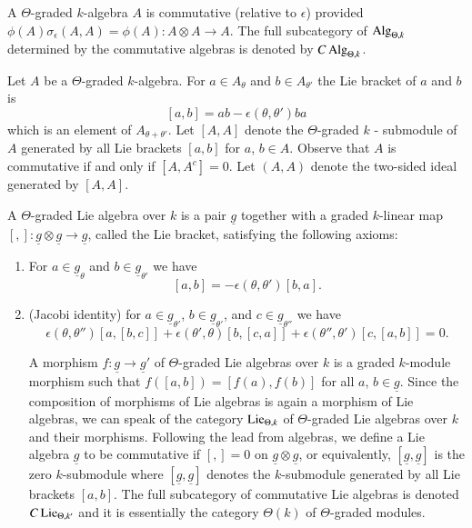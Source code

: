 \begin{definition}\label{chap2-defi2.2}
A $\Theta$-graded $k$-algebra $A$ is commutative (relative to
$\epsilon$) provided $\phi(A)\sigma_{\epsilon}(A,A)=\phi(A):A\otimes
A\to A$. The full subcategory of $\operatorname{Alg}_{\Theta,k}$\pageoriginale
determined by the commutative algebras is denoted by
$C\operatorname{Alg}_{\Theta,k}$. 
\end{definition}

\begin{remark}\label{chap2-rem2.3}
Let $A$ be a $\Theta$-graded $k$-algebra. For $a\in A_{\theta}$ and
$b\in A_{\theta'}$ the Lie bracket of $a$ and $b$ is 
$$
[a,b]=ab-\epsilon(\theta,\theta')ba
$$
which is an element of $A_{\theta+\theta'}$. Let $[A,A]$ denote the
$\Theta$-graded $k$ - submodule of $A$ generated by all Lie brackets
$[a,b]$ for $a$, $b\in A$. Observe that $A$ is commutative if and only
if $[A,A^{c}]=0$. Let $(A,A)$ denote the two-sided ideal generated by
$[A,A]$. 
\end{remark}

\begin{definition}\label{chap2-defi2.4}
A $\Theta$-graded Lie algebra over $k$ is a pair $\underline{g}$
together with a graded $k$-linear map $[,]:\underline{g}\otimes
\underline{g}\to \underline{g}$, called the Lie bracket, satisfying
the following axioms:
\begin{enumerate}
\renewcommand{\labelenumi}{(\theenumi)}
\item For $a\in\underline{g}_{\theta}$ and $b\in
  \underline{g}_{\theta'}$ we have
$$
[a,b]=-\epsilon(\theta,\theta')[b,a].
$$

\item (Jacobi identity) for $a\in \underline{g}_{\theta'}$, $b\in
  \underline{g}_{\theta'}$, and $c\in \underline{g}_{\theta''}$ we
  have
$$
\epsilon(\theta,\theta'')[a,[b,c]]+\epsilon(\theta',\theta)[b,[c,a]]+\epsilon(\theta'',\theta')[c,[a,b]]=0. 
$$

A morphism $f:\underline{g}\to \underline{g}'$ of $\Theta$-graded Lie
algebras over $k$ is a graded $k$-module morphism such that
$f([a,b])=[f(a),f(b)]$ for all $a$, $b\in \underline{g}$. Since the
composition of morphisms of Lie algebras is again a morphism of Lie
algebras, we can speak of the category $\operatorname{Lie}_{\Theta,k}$ of
$\Theta$-graded Lie algebras over $k$ and their morphisms. Following
the lead from algebras, we define a Lie algebra $\underline{g}$ to be
commutative if $[,]=0$ on $\underline{g}\otimes \underline{g}$, or
equivalently, $[\underline{g},\underline{g}]$ is the zero
$k$-submodule where $[\underline{g},\underline{g}]$ denotes the
$k$-submodule generated by all Lie brackets $[a,b]$. The full
subcategory of commutative Lie algebras is denoted $C\operatorname{Lie}_{\Theta,k'}$
and it is essentially the category $\Theta(k)$ of $\Theta$-graded
modules. 
\end{enumerate}
\end{definition}

